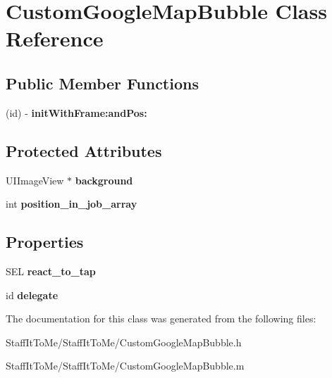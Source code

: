 \hypertarget{interface_custom_google_map_bubble}{
\section{\-Custom\-Google\-Map\-Bubble \-Class \-Reference}
\label{interface_custom_google_map_bubble}
}
\subsection*{\-Public \-Member \-Functions}
\begin{DoxyCompactItemize}
\item 
\hypertarget{interface_custom_google_map_bubble_aeb963b3e91ec3538374bbd4ad040349d}{
(id) -\/ {\bfseries init\-With\-Frame\-:and\-Pos\-:}}
\label{interface_custom_google_map_bubble_aeb963b3e91ec3538374bbd4ad040349d}

\end{DoxyCompactItemize}
\subsection*{\-Protected \-Attributes}
\begin{DoxyCompactItemize}
\item 
\hypertarget{interface_custom_google_map_bubble_a91bb269b8bd998dd86b4d2c0601c042b}{
\-U\-I\-Image\-View $\ast$ {\bfseries background}}
\label{interface_custom_google_map_bubble_a91bb269b8bd998dd86b4d2c0601c042b}

\item 
\hypertarget{interface_custom_google_map_bubble_ab48fb6081db9ec76fcc3fa5c4c73d601}{
int {\bfseries position\-\_\-in\-\_\-job\-\_\-array}}
\label{interface_custom_google_map_bubble_ab48fb6081db9ec76fcc3fa5c4c73d601}

\end{DoxyCompactItemize}
\subsection*{\-Properties}
\begin{DoxyCompactItemize}
\item 
\hypertarget{interface_custom_google_map_bubble_a4552b2cbfc83be6f3e7bcdb355be17d6}{
\-S\-E\-L {\bfseries react\-\_\-to\-\_\-tap}}
\label{interface_custom_google_map_bubble_a4552b2cbfc83be6f3e7bcdb355be17d6}

\item 
\hypertarget{interface_custom_google_map_bubble_ada97ed11a085fba701f319e6c69931c4}{
id {\bfseries delegate}}
\label{interface_custom_google_map_bubble_ada97ed11a085fba701f319e6c69931c4}

\end{DoxyCompactItemize}


\-The documentation for this class was generated from the following files\-:\begin{DoxyCompactItemize}
\item 
\-Staff\-It\-To\-Me/\-Staff\-It\-To\-Me/\-Custom\-Google\-Map\-Bubble.\-h\item 
\-Staff\-It\-To\-Me/\-Staff\-It\-To\-Me/\-Custom\-Google\-Map\-Bubble.\-m\end{DoxyCompactItemize}
